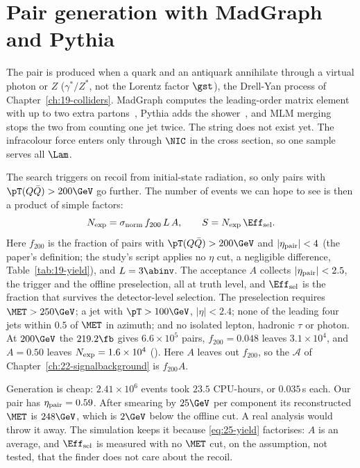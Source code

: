 \section{Pair generation with MadGraph and Pythia}\label{sec:25-generation}

The pair is produced when a quark and an antiquark annihilate through a virtual photon or $Z$ ($\gamma^*/Z^*$, not the Lorentz factor $\gst$), the Drell-Yan process
of Chapter~\ref{ch:19-colliders}. MadGraph computes the leading-order matrix element with up to two extra
partons~\cite{Alwall:2014hca}, Pythia adds the shower~\cite{Bierlich:2022pfr}, and MLM merging~\cite{Alwall:2007fs}
stops the two from counting one jet twice. The string does not exist yet. The infracolour force enters only through $\NIC$
in the cross section, so one sample serves all $\Lam$.

The search triggers on recoil from initial-state radiation, so only pairs with $\pT(Q\bar Q)>200\GeV$ go further. The
number of events we can hope to see is then a product of simple factors:
\begin{equation}
  N_{\rm exp}=\sigma_{\rm norm}\,f_{200}\,L\,A,\qquad S=N_{\rm exp}\,\Eff_{\rm sel}.
  \label{eq:25-yield}
\end{equation}
Here $f_{200}$ is the fraction of pairs with $\pT(Q\bar Q)>200\GeV$ and $|\eta_{\rm pair}|<4$ (the paper's definition; the study's script applies no $\eta$ cut, a negligible difference, Table~\ref{tab:19-yield}), and $L=3\abinv$. The acceptance $A$ collects
$|\eta_{\rm pair}|<2.5$, the trigger and the offline preselection, all at truth level, and $\Eff_{\rm sel}$ is the
fraction that survives the detector-level selection. The preselection requires $\MET>250\GeV$; a jet with $\pT>100\GeV$, $|\eta|<2.4$; none of the leading four jets within $0.5$ of $\MET$ in azimuth; and no isolated lepton, hadronic $\tau$ or photon. At $200\GeV$ the $219.2\fb$ gives $6.6\times10^5$ pairs,
$f_{200}=0.048$ leaves $3.1\times10^4$, and $A=0.50$ leaves $N_{\rm exp}=1.6\times10^4$ (\EST). Here $A$ leaves out $f_{200}$, so the $\mathcal A$ of Chapter~\ref{ch:22-signalbackground} is $f_{200}A$.

Generation is cheap: $2.41\times10^6$ events took $23.5$ CPU-hours, or $0.035$\,s each. Our pair has
$\eta_{\rm pair}=0.59$. After smearing by $25\GeV$ per component its reconstructed $\MET$ is $248\GeV$, which is $2\GeV$ below the offline
cut. A real analysis would throw it away. The simulation keeps it because \eqref{eq:25-yield} factorises: $A$ is an
average, and $\Eff_{\rm sel}$ is measured with no $\MET$ cut, on the assumption, not tested, that the finder does not care about the
recoil.

